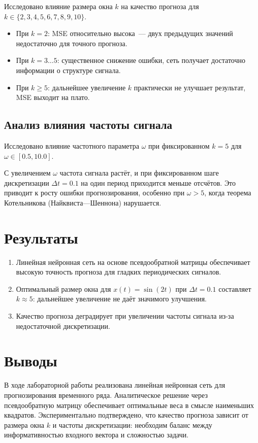 \documentclass[14pt,a4paper]{extarticle}
\begin{document}
Исследовано влияние размера окна $k$ на качество прогноза для $k \in \{2, 3, 4, 5, 6, 7, 8, 9, 10\}$.

\begin{itemize}
\item При $k = 2$: MSE относительно высока~--- двух предыдущих значений недостаточно для точного прогноза.
\item При $k = 3 \ldots 5$: существенное снижение ошибки, сеть получает достаточно информации о структуре сигнала.
\item При $k \geq 5$: дальнейшее увеличение $k$ практически не улучшает результат, MSE выходит на плато.
\end{itemize}

\subsection{Анализ влияния частоты сигнала}

Исследовано влияние частотного параметра $\omega$ при фиксированном $k = 5$ для $\omega \in [0.5, 10.0]$.

С увеличением $\omega$ частота сигнала растёт, и при фиксированном шаге дискретизации $\Delta t = 0.1$ на один период приходится меньше отсчётов. Это приводит к росту ошибки прогнозирования, особенно при $\omega > 5$, когда теорема Котельникова (Найквиста---Шеннона) нарушается.

\section{Результаты}

\begin{enumerate}
\item Линейная нейронная сеть на основе псевдообратной матрицы обеспечивает высокую точность прогноза для гладких периодических сигналов.
\item Оптимальный размер окна для $x(t) = \sin(2t)$ при $\Delta t = 0.1$ составляет $k \approx 5$: дальнейшее увеличение не даёт значимого улучшения.
\item Качество прогноза деградирует при увеличении частоты сигнала из-за недостаточной дискретизации.
\end{enumerate}

\section{Выводы}

В ходе лабораторной работы реализована линейная нейронная сеть для прогнозирования временного ряда. Аналитическое решение через псевдообратную матрицу обеспечивает оптимальные веса в смысле наименьших квадратов. Экспериментально подтверждено, что качество прогноза зависит от размера окна $k$ и частоты дискретизации: необходим баланс между информативностью входного вектора и сложностью задачи.
\end{document}
